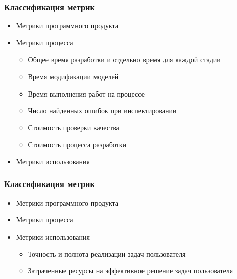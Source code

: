 \documentclass{../../slides-style}
\begin{document}
    \begin{frame}
        \frametitle{Классификация метрик}
        \begin{itemize}
            \item Метрики программного продукта
            \item Метрики процесса
            \begin{itemize}
                \item Общее время разработки и отдельно время для каждой стадии
                \item Время модификации моделей
                \item Время выполнения работ на процессе
                \item Число найденных ошибок при инспектировании
                \item Стоимость проверки качества
                \item Стоимость процесса разработки
            \end{itemize}
            \item Метрики использования
        \end{itemize}
    \end{frame}

    \begin{frame}
        \frametitle{Классификация метрик}
        \begin{itemize}
            \item Метрики программного продукта
            \item Метрики процесса
            \item Метрики использования
            \begin{itemize}
                \item Точность и полнота реализации задач пользователя
                \item Затраченные ресурсы на эффективное решение задач пользователя
            \end{itemize}
        \end{itemize}
    \end{frame}
\end{document}
